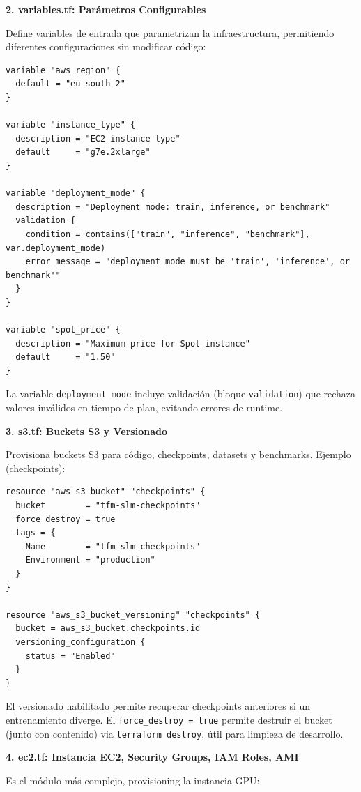 \textbf{2. variables.tf: Parámetros Configurables}

Define variables de entrada que parametrizan la infraestructura, permitiendo diferentes configuraciones sin modificar código:

\begin{lstlisting}[language=hcl, caption={variables.tf: variables clave}]
variable "aws_region" {
  default = "eu-south-2"
}

variable "instance_type" {
  description = "EC2 instance type"
  default     = "g7e.2xlarge"
}

variable "deployment_mode" {
  description = "Deployment mode: train, inference, or benchmark"
  validation {
    condition = contains(["train", "inference", "benchmark"], var.deployment_mode)
    error_message = "deployment_mode must be 'train', 'inference', or benchmark'"
  }
}

variable "spot_price" {
  description = "Maximum price for Spot instance"
  default     = "1.50"
}
\end{lstlisting}

La variable \texttt{deployment\_mode} incluye validación (bloque \texttt{validation}) que rechaza valores inválidos en tiempo de plan, evitando errores de runtime.

\textbf{3. s3.tf: Buckets S3 y Versionado}

Provisiona buckets S3 para código, checkpoints, datasets y benchmarks. Ejemplo (checkpoints):

\begin{lstlisting}[language=hcl, caption={s3.tf: bucket con versionado para checkpoints}]
resource "aws_s3_bucket" "checkpoints" {
  bucket        = "tfm-slm-checkpoints"
  force_destroy = true
  tags = {
    Name        = "tfm-slm-checkpoints"
    Environment = "production"
  }
}

resource "aws_s3_bucket_versioning" "checkpoints" {
  bucket = aws_s3_bucket.checkpoints.id
  versioning_configuration {
    status = "Enabled"
  }
}
\end{lstlisting}

El versionado habilitado permite recuperar checkpoints anteriores si un entrenamiento diverge. El \texttt{force\_destroy = true} permite destruir el bucket (junto con contenido) via \texttt{terraform destroy}, útil para limpieza de desarrollo.

\textbf{4. ec2.tf: Instancia EC2, Security Groups, IAM Roles, AMI}

Es el módulo más complejo, provisioning la instancia GPU:

